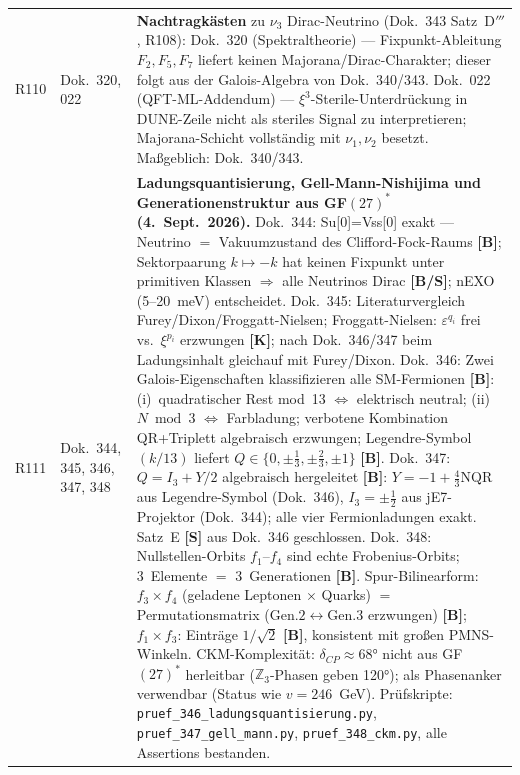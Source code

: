\begin{longtable}{@{}p{0.9cm}p{3.1cm}p{10.2cm}@{}}
R110 & Dok.~320, 022 & \textbf{Nachtragkästen} zu $\nu_3$ Dirac-Neutrino (Dok.~343 Satz~D$'''$, R108): Dok.~320 (Spektraltheorie) --- Fixpunkt-Ableitung $F_2,F_5,F_7$ liefert keinen Majorana/Dirac-Charakter; dieser folgt aus der Galois-Algebra von Dok.~340/343. Dok.~022 (QFT-ML-Addendum) --- $\xi^3$-Sterile-Unterdrückung in DUNE-Zeile nicht als steriles Signal zu interpretieren; Majorana-Schicht vollständig mit $\nu_1,\nu_2$ besetzt. Maßgeblich: Dok.~340/343. \\
R111 & Dok.~344, 345, 346, 347, 348 & \textbf{Ladungsquantisierung, Gell-Mann-Nishijima und Generationenstruktur aus GF$(27)^*$ (4.~Sept.~2026).} Dok.~344: Su[0]=Vss[0] exakt --- Neutrino $=$ Vakuumzustand des Clifford-Fock-Raums \textbf{[B]}; Sektorpaarung $k\mapsto-k$ hat keinen Fixpunkt unter primitiven Klassen $\Rightarrow$ alle Neutrinos Dirac \textbf{[B/S]}; nEXO (5--20~meV) entscheidet. Dok.~345: Literaturvergleich Furey/Dixon/Froggatt-Nielsen; Froggatt-Nielsen: $\varepsilon^{q_i}$ frei vs.\ $\xi^{p_i}$ erzwungen \textbf{[K]}; nach Dok.~346/347 beim Ladungsinhalt gleichauf mit Furey/Dixon. Dok.~346: Zwei Galois-Eigenschaften klassifizieren alle SM-Fermionen \textbf{[B]}: (i)~quadratischer Rest mod~13 $\Leftrightarrow$ elektrisch neutral; (ii)~$N\bmod3$ $\Leftrightarrow$ Farbladung; verbotene Kombination QR+Triplett algebraisch erzwungen; Legendre-Symbol $(k/13)$ liefert $Q\in\{0,\pm\tfrac{1}{3},\pm\tfrac{2}{3},\pm1\}$ \textbf{[B]}. Dok.~347: $Q=I_3+Y/2$ algebraisch hergeleitet \textbf{[B]}: $Y=-1+\tfrac{4}{3}\mathrm{NQR}$ aus Legendre-Symbol (Dok.~346), $I_3=\pm\tfrac{1}{2}$ aus jE7-Projektor (Dok.~344); alle vier Fermionladungen exakt. Satz~E \textbf{[S]} aus Dok.~346 geschlossen. Dok.~348: Nullstellen-Orbits $f_1$--$f_4$ sind echte Frobenius-Orbits; 3~Elemente $=$ 3~Generationen \textbf{[B]}. Spur-Bilinearform: $f_3\times f_4$ (geladene Leptonen $\times$ Quarks) $=$ Permutationsmatrix (Gen.$2\leftrightarrow$Gen.$3$ erzwungen) \textbf{[B]}; $f_1\times f_3$: Einträge $1/\sqrt{2}$ \textbf{[B]}, konsistent mit großen PMNS-Winkeln. CKM-Komplexität: $\delta_{CP}\approx68°$ nicht aus GF$(27)^*$ herleitbar ($\mathbb{Z}_3$-Phasen geben 120°); als Phasenanker verwendbar (Status wie $v=246$~GeV). Prüfskripte: \texttt{pruef\_346\_ladungsquantisierung.py}, \texttt{pruef\_347\_gell\_mann.py}, \texttt{pruef\_348\_ckm.py}, alle Assertions bestanden. \\

\end{longtable}
